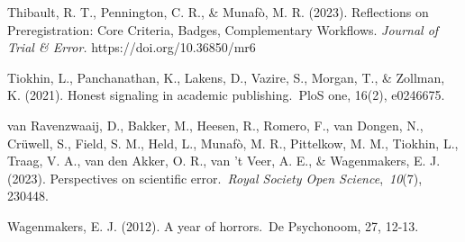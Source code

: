 \documentclass[authordate, editorial,noabstract]{jote-new-article}
\begin{document}
	Thibault, R. T., Pennington, C. R., \& Munafò, M. R. (2023). Reflections on Preregistration: Core Criteria, Badges, Complementary Workflows. \emph{Journal of Trial \& Error. }https://doi.org/10.36850/mr6



	Tiokhin, L., Panchanathan, K., Lakens, D., Vazire, S., Morgan, T., \& Zollman, K. (2021). Honest signaling in academic publishing. PloS one, 16(2), e0246675.



	van Ravenzwaaij, D., Bakker, M., Heesen, R., Romero, F., van Dongen, N., Crüwell, S., Field, S. M., Held, L., Munafò, M. R., Pittelkow, M. M., Tiokhin, L., Traag, V. A., van den Akker, O. R., van 't Veer, A. E., \& Wagenmakers, E. J. (2023). Perspectives on scientific error. \emph{Royal Society Open Science}, \emph{10}(7), 230448.



	Wagenmakers, E. J. (2012). A year of horrors. De Psychonoom, 27, 12-13.
\end{document}
